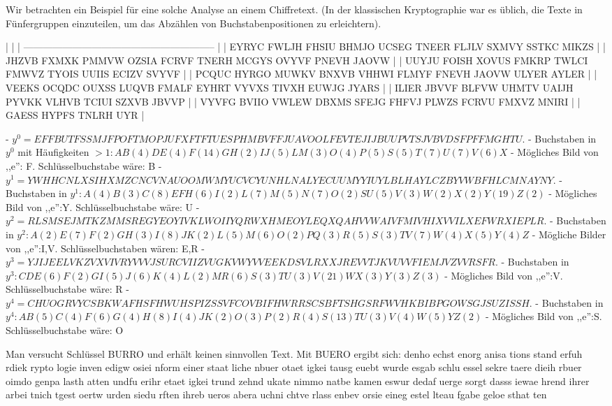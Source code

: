 \documentclass[a4paper]{article}
\begin{document}
\begin{multicols}{3}
        Wir betrachten ein Beispiel für eine solche Analyse an einem Chiffretext. (In der klassischen Kryptographie war es üblich, die Texte in Fünfergruppen einzuteilen, um das Abzählen von Buchstabenpositionen zu erleichtern).

        |                                                             |
        | ----------------------------------------------------------- |
        | EYRYC FWLJH FHSIU BHMJO UCSEG TNEER FLJLV SXMVY SSTKC MIKZS |
        | JHZVB FXMXK PMMVW OZSIA FCRVF TNERH MCGYS OVYVF PNEVH JAOVW |
        | UUYJU FOISH XOVUS FMKRP TWLCI FMWVZ TYOIS UUIIS ECIZV SVYVF |
        | PCQUC HYRGO MUWKV BNXVB VHHWI FLMYF FNEVH JAOVW ULYER AYLER |
        | VEEKS OCQDC OUXSS LUQVB FMALF EYHRT VYVXS TIVXH EUWJG JYARS |
        | ILIER JBVVF BLFVW UHMTV UAIJH PYVKK VLHVB TCIUI SZXVB JBVVP |
        | VYVFG BVIIO VWLEW DBXMS SFEJG FHFVJ PLWZS FCRVU FMXVZ MNIRI |
        | GAESS HYPFS TNLRH UYR                                       |

        - $y^0 =EFFBUTFSSMJFPOFTMOPJUFXFTFTUESPHMBVFFJUAVOOLFEVTEJIJBUUPVTSJVBVDSFPFFMGHTU$.
        - Buchstaben in $y^0$ mit Häufigkeiten $>1:AB(4)DE(4)F(14)GH(2)IJ(5)LM(3)O(4)P(5)S(5)T(7)U(7)V(6)X$
        - Mögliches Bild von ,,e'': F. Schlüsselbuchstabe wäre: B
        - $y^1 =YWHHCNLXSIHXMZCNCVNAUOOMWMYUCVCYUNHLNALYECUUMYYIUYLBLHAYLCZBYVWBFHLCMNAYNY$.
        - Buchstaben in $y^1:A(4)B(3)C(8)EFH(6)I(2)L(7)M(5)N(7)O(2)SU(5)V(3)W(2)X(2)Y(19)Z(2)$
        - Mögliches Bild von ,,e'':Y. Schlüsselbuchstabe wäre: U
        - $y^2 =RLSMSEJMTKZMMSREGYEOYIVKLWOIIYQRWXHMEOYLEQXQAHVVWAIVFMIVHIXVVILXEFWRXIEPLR$.
        - Buchstaben in $y^2:A(2)E(7)F(2)GH(3)I(8)JK(2)L(5)M(6)O(2)PQ(3)R(5)S(3)TV(7)W(4)X(5)Y(4)Z$
        - Mögliche Bilder von ,,e'':I,V. Schlüsselbuchstaben wären: E,R
        - $y^3 =YJIJEELVKZVXVIVRYVVVJSURCVIIZVUGKVWYVVEEKDSVLRXXJREVVTJKVUVVFIEMJVZVVRSFR$.
        - Buchstaben in $y^3 :CDE(6)F(2)GI(5)J(6)K(4)L(2)MR(6)S(3)TU(3)V(21)WX(3)Y(3)Z(3)$
        - Mögliches Bild von ,,e'':V. Schlüsselbuchstabe wäre: R
        - $y^4 =CHUOGRVYCSBKWAFHSFHWUHSPIZSSVFCOVBIFHWRRSCSBFTSHGSRFWVHKBIBPGOWSGJSUZISSH$.
        - Buchstaben in $y^4 :AB(5)C(4)F(6)G(4)H(8)I(4)JK(2)O(3)P(2)R(4)S(13)TU(3)V(4)W(5)YZ(2)$
        - Mögliches Bild von ,,e'':S. Schlüsselbuchstabe wäre: O

        Man versucht Schlüssel BURRO und erhält keinen sinnvollen Text. Mit BUERO ergibt sich:
        denho echst enorg anisa tions stand erfuh rdiek rypto logie
        inven edigw osiei nform einer staat liche nbuer otaet igkei
        tausg euebt wurde esgab schlu essel sekre taere dieih rbuer
        oimdo genpa lasth atten undfu erihr etaet igkei trund zehnd
        ukate nimmo natbe kamen eswur dedaf uerge sorgt dasss iewae
        hrend ihrer arbei tnich tgest oertw urden siedu rften ihreb
        ueros abera uchni chtve rlass enbev orsie eineg estel lteau
        fgabe geloe sthat ten


\end{multicols}
\end{document}
